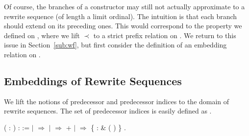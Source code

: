 Of course, the branches of a 
constructor may still not actually approximate to a rewrite sequence (of
length a limit ordinal). The intuition is that each branch should extend on
its preceding ones. This would correspond to the
 property we defined on
, where we lift $\prec$ to a
strict prefix relation on
.
We return to this issue in Section~\ref{sub:wf}, but
first consider the definition of an embedding relation on
.


\subsection{Embeddings of Rewrite Sequences}

We lift the notions of predecessor and predecessor indices to the domain of
rewrite sequences. The set of predecessor indices is easily defined as
.
\begin{singlespace}
\begin{coqdoccode}
\coqdocnoindent
{}
 
(\coqdocvar{$\varphi$} : 
 ) :
 :=\coqdoceol
\coqdocindent{1.00em}
 \coqdocvariable{$\varphi$} \coqdoceol
\coqdocindent{1.00em}
\ensuremath{|}  \coqdocvar{\_}
\ensuremath{\Rightarrow}
\coqdoceol
\coqdocindent{1.00em}
\ensuremath{|} 
\coqdocvar{\_} \coqdocvar{\_} \coqdocvar{\_} \coqdocvar{$\psi$} \coqdocvar{\_}
\ensuremath{\Rightarrow}
+ 
\coqdocvariable{$\psi$}\coqdoceol
\coqdocindent{1.00em}
\ensuremath{|}  \coqdocvar{\_}
\coqdocvar{\_} \coqdocvar{\_}  \coqdocvar{\_}
\ensuremath{\Rightarrow} \{  :
\& 
( ) \}\coqdoceol
\coqdocindent{1.00em}
.\coqdoceol
\end{coqdoccode}
\end{singlespace}

